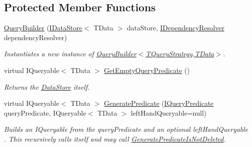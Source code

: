 \subsection*{Protected Member Functions}
\begin{DoxyCompactItemize}
\item 
\hyperlink{classCqrs_1_1Repositories_1_1Queries_1_1QueryBuilder_a8a7b6495f78adedc7b7a82d2c83f17d5_a8a7b6495f78adedc7b7a82d2c83f17d5}{Query\+Builder} (\hyperlink{interfaceCqrs_1_1DataStores_1_1IDataStore}{I\+Data\+Store}$<$ T\+Data $>$ data\+Store, \hyperlink{interfaceCqrs_1_1Configuration_1_1IDependencyResolver}{I\+Dependency\+Resolver} dependency\+Resolver)
\begin{DoxyCompactList}\small\item\em Instantiates a new instance of \hyperlink{classCqrs_1_1Repositories_1_1Queries_1_1QueryBuilder_a8a7b6495f78adedc7b7a82d2c83f17d5_a8a7b6495f78adedc7b7a82d2c83f17d5}{Query\+Builder$<$\+T\+Query\+Strategy,\+T\+Data$>$}. \end{DoxyCompactList}\item 
virtual I\+Queryable$<$ T\+Data $>$ \hyperlink{classCqrs_1_1Repositories_1_1Queries_1_1QueryBuilder_a7dc8f0da3bb4ef54b8cbdda6c50ee0a1_a7dc8f0da3bb4ef54b8cbdda6c50ee0a1}{Get\+Empty\+Query\+Predicate} ()
\begin{DoxyCompactList}\small\item\em Returns the \hyperlink{classCqrs_1_1Repositories_1_1Queries_1_1QueryBuilder_a8a64851b3bf82ed5d2e708cd39d71890_a8a64851b3bf82ed5d2e708cd39d71890}{Data\+Store} itself. \end{DoxyCompactList}\item 
virtual I\+Queryable$<$ T\+Data $>$ \hyperlink{classCqrs_1_1Repositories_1_1Queries_1_1QueryBuilder_a553ad69e77d37f28b40e6c9d8e98b716_a553ad69e77d37f28b40e6c9d8e98b716}{Generate\+Predicate} (\hyperlink{interfaceCqrs_1_1Repositories_1_1Queries_1_1IQueryPredicate}{I\+Query\+Predicate} query\+Predicate, I\+Queryable$<$ T\+Data $>$ left\+Hand\+Queryable=null)
\begin{DoxyCompactList}\small\item\em Builds an I\+Queryable from the {\itshape query\+Predicate}  and an optional {\itshape left\+Hand\+Queryable} . This recursively calls itself and may call \hyperlink{classCqrs_1_1Repositories_1_1Queries_1_1QueryBuilder_a9a6596d3dd0e4489bfa2d5d93ac93ec8_a9a6596d3dd0e4489bfa2d5d93ac93ec8}{Generate\+Predicate\+Is\+Not\+Deleted}. \end{DoxyCompactList}\item 

\end{DoxyCompactItemize}
